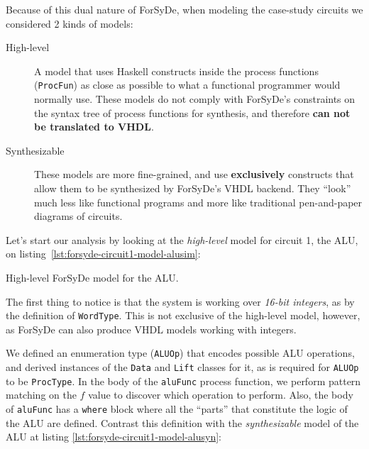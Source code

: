             Because of this dual nature of ForSyDe, when modeling the case-study circuits we
            considered 2 kinds of models:

            \begin{description}
                \item[High-level] A model that uses Haskell constructs inside the process functions
                    (\texttt{ProcFun}) as close as possible to what a functional programmer would
                    normally use. These models do not comply with ForSyDe's constraints on the
                    syntax tree of process functions for synthesis, and therefore \textbf{can
                        not be translated to VHDL}.

                \item[Synthesizable] These models are more fine-grained, and use
                    \textbf{exclusively} constructs that allow them to be synthesized by ForSyDe's
                    VHDL backend. They ``look'' much less like functional programs and more like
                    traditional pen-and-paper diagrams of circuits.
            \end{description}

            Let's start our analysis by looking at the \emph{high-level} model for circuit 1, the
            ALU, on listing~\ref{lst:forsyde-circuit1-model-alusim}:

            \begin{listing}[h!]
                \caption{High-level ForSyDe model for the ALU.
                    \label{lst:forsyde-circuit1-model-alusim}}
            \end{listing}

            The first thing to notice is that the system is working over \emph{16-bit integers}, as
            by the definition of \texttt{WordType}. This is not exclusive of the high-level model,
            however, as ForSyDe can also produce VHDL models working with integers.

            We defined an enumeration type (\texttt{ALUOp}) that encodes possible ALU operations,
            and derived instances of the \texttt{Data} and \texttt{Lift} classes for it, as is
            required for \texttt{ALUOp} to be \texttt{ProcType}. In the body of the \texttt{aluFunc}
            process function, we perform pattern matching on the $f$ value to discover which
            operation to perform. Also, the body of \texttt{aluFunc} has a \texttt{where} block
            where all the ``parts'' that constitute the logic of the ALU are defined. Contrast this
            definition with the \emph{synthesizable} model of the ALU at listing
            \ref{lst:forsyde-circuit1-model-alusyn}:

